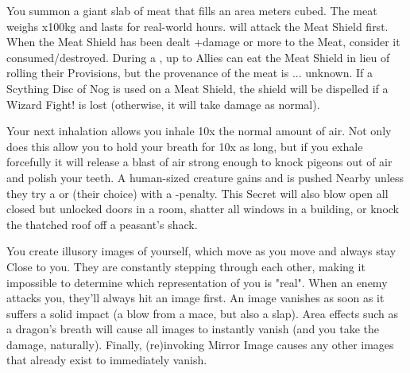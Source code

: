 \WIZARDRY[
  Name=Meat Shield,
  Link=secrets-meat-shield,
  Alignment=Biomancy,
  Save=N,
  Duration=\DICE real-world hours,
  Counter=None ,
  Keywords=None,
  Target=Close and Nearby
]

You summon a giant slab of meat that fills an area \DICE meters cubed.  The meat weighs \DICE x100kg and lasts for \DICE real-world hours.  will attack the Meat Shield first. When the Meat Shield has been dealt \SUMDICE+\DICE damage or more to the Meat, consider it consumed/destroyed. During a , up to \DICE Allies can eat the Meat Shield in lieu of rolling their Provisions, but the provenance of the meat is ... unknown.  If a Scything Disc of Nog is used on a Meat Shield, the shield will be dispelled if a Wizard Fight! is lost (otherwise, it will take damage as normal).

\WIZARDRY[
  Name=Mighty Lungs,
  Link=secrets-mighty-lungs,
  Alignment=Biomancy,
  Save=N,
  Duration=Until exhalation,
  Counter=None ,
  Keywords=Contested,
  Target=Self
]

Your next inhalation allows you inhale 10x the normal amount of air. Not only does this allow you to hold your breath for 10x as long, but if you
exhale forcefully it will release a blast of air strong enough to knock pigeons out of air and polish your teeth. A human-sized creature gains  and is pushed Nearby unless they try a \RBTRY{\DEX}{\INT} or \RBTRY{\VIG}{\INT} (their choice) with a -\DICE penalty.  This Secret will also blow open all closed but unlocked doors in a room, shatter all windows in a building, or knock the thatched roof off a peasant's shack.

\WIZARDRY[
  Name=Mirror Image,
  Link=secrets-mirror-image,
  Alignment=Entropy,
  Save=N,
  Duration=Session,
  Counter=None ,
  Keywords=None,
  Target=Self
]

You create \DICE illusory images of yourself, which move as you move and always stay Close to you. They are constantly stepping through each other,
making it impossible to determine which representation of you is "real". When an enemy attacks you, they'll always hit an image first.  An image vanishes as soon as it suffers
a solid impact (a blow from a mace, but also a slap). Area effects such as a dragon's breath will cause all images to instantly vanish (and you take the
damage, naturally). Finally, (re)invoking Mirror Image causes any other images that already exist to immediately vanish.


